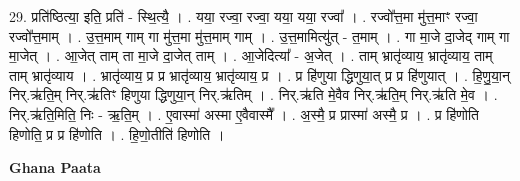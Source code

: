 \documentclass[17pt]{extarticle}
\begin{document}
29. प्रति॑ष्ठित्या॒ इति॒ प्रति॑ - स्थि॒त्यै॒ । . यया॒ रज्वा॒ रज्वा॒ यया॒ यया॒ रज्वा᳚ । . रज्वो᳚त्त॒मा मु॑त्त॒माꣳ रज्वा॒ रज्वो᳚त्त॒माम् । . उ॒त्त॒माम् गाम् गा मु॑त्त॒मा मु॑त्त॒माम् गाम् । . उ॒त्त॒मामित्यु॑त् - त॒माम् । . गा मा॒जे दा॒जेद् गाम् गा मा॒जेत् । . आ॒जेत् ताम् ता मा॒जे दा॒जेत् ताम् । . आ॒जेदित्या᳚ - अ॒जेत् । . ताम् भ्रातृ॑व्याय॒ भ्रातृ॑व्याय॒ ताम् ताम् भ्रातृ॑व्याय । . भ्रातृ॑व्याय॒ प्र प्र भ्रातृ॑व्याय॒ भ्रातृ॑व्याय॒ प्र । . प्र हि॑णुया द्धिणुया॒त् प्र प्र हि॑णुयात् । . हि॒णु॒या॒न् निर्.ऋ॑ति॒म् निर्.ऋ॑तिꣳ हिणुया द्धिणुया॒न् निर्.ऋ॑तिम् । . निर्.ऋ॑ति मे॒वैव निर्.ऋ॑ति॒म् निर्.ऋ॑ति मे॒व । . निर्.ऋ॑ति॒मिति॒ निः - ऋ॒ति॒म् । . ए॒वास्मा॑ अस्मा ए॒वैवास्मै᳚ । . अ॒स्मै॒ प्र प्रास्मा॑ अस्मै॒ प्र । . प्र हि॑णोति हिणोति॒ प्र प्र हि॑णोति । . हि॒णो॒तीति॑ हिणोति । \newline

\textbf{Ghana Paata } \newline
\end{document}

